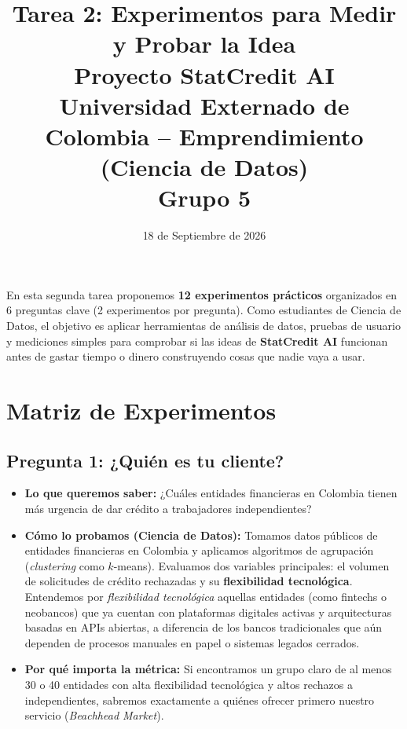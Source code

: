 \documentclass[11pt,a4paper]{article}
\title{
    \vspace{-1cm}
    \textbf{\huge Tarea 2: Experimentos para Medir y Probar la Idea}\\[0.3cm]
    \large\textbf{Proyecto StatCredit AI}\\[0.1cm]
    \small Universidad Externado de Colombia -- Emprendimiento (Ciencia de Datos)\\[0.1cm]
    \small\textbf{Grupo 5}
}
\author{}
\date{18 de Septiembre de 2026}
\begin{document}
\maketitle

\begin{tcolorbox}[colback=primary!5,colframe=primary,title=\textbf{¿De qué trata este entregable?}]
En esta segunda tarea proponemos \textbf{12 experimentos prácticos} organizados en 6 preguntas clave (2 experimentos por pregunta). Como estudiantes de Ciencia de Datos, el objetivo es aplicar herramientas de análisis de datos, pruebas de usuario y mediciones simples para comprobar si las ideas de \textbf{StatCredit AI} funcionan antes de gastar tiempo o dinero construyendo cosas que nadie vaya a usar.
\end{tcolorbox}

\section{Matriz de Experimentos}

\subsection{Pregunta 1: ¿Quién es tu cliente?}

\begin{tcolorbox}[colback=lightgray,colframe=secondary,title=\textbf{Experimento 1.1: Agrupar empresas para encontrar nuestro primer cliente}]
\begin{itemize}[leftmargin=*]
    \item \textbf{Lo que queremos saber:} ¿Cuáles entidades financieras en Colombia tienen más urgencia de dar crédito a trabajadores independientes?
    \item \textbf{Cómo lo probamos (Ciencia de Datos):} Tomamos datos públicos de entidades financieras en Colombia y aplicamos algoritmos de agrupación (\textit{clustering} como $k$-means). Evaluamos dos variables principales: el volumen de solicitudes de crédito rechazadas y su \textbf{flexibilidad tecnológica}. Entendemos por \textit{flexibilidad tecnológica} aquellas entidades (como fintechs o neobancos) que ya cuentan con plataformas digitales activas y arquitecturas basadas en APIs abiertas, a diferencia de los bancos tradicionales que aún dependen de procesos manuales en papel o sistemas legados cerrados.
    \item \textbf{Por qué importa la métrica:} Si encontramos un grupo claro de al menos 30 o 40 entidades con alta flexibilidad tecnológica y altos rechazos a independientes, sabremos exactamente a quiénes ofrecer primero nuestro servicio (\textit{Beachhead Market}).
\end{itemize}
\end{tcolorbox}
\end{document}
